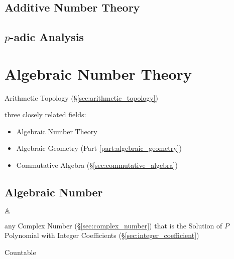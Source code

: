 \subsection{Additive Number Theory}\label{sec:additive_number_theory}

\subsection{$p$-adic Analysis}\label{sec:padic_analysis}



\section{Algebraic Number Theory}\label{sec:algebraic_number_theory}

Arithmetic Topology (\S\ref{sec:arithmetic_topology})

three closely related fields:
\begin{itemize}
  \item Algebraic Number Theory
  \item Algebraic Geometry (Part \ref{part:algebraic_geometry})
  \item Commutative Algebra (\S\ref{sec:commutative_algebra})
\end{itemize}



\subsection{Algebraic Number}\label{sec:algebraic_number}

$\mathbb{A}$

any Complex Number (\S\ref{sec:complex_number}) that is the Solution of $P$
Polynomial with Integer Coefficients (\S\ref{sec:integer_coefficient})

Countable

